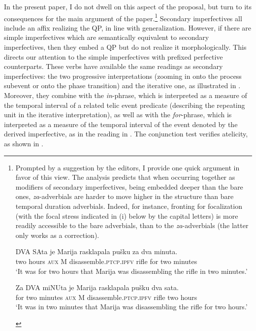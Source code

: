 \documentclass[output=paper]{langscibook}
\begin{document}
In the present paper, I do not dwell on this aspect of the proposal, but turn to its consequences for the main argument of the paper.{\footnote{Prompted by a suggestion by the editors, I provide one quick argument in favor of this view. The analysis predicts that when occurring together as modifiers of secondary imperfectives, being embedded deeper than the bare ones, \textit{za}-adverbials are harder to move higher in the structure than bare temporal duration adverbials. Indeed, for instance, fronting for focalization (with the focal stress indicated in (i) below by the capital letters) is more readily accessible to the bare adverbials, than to the \textit{za}-adverbials (the latter only works as a correction).
\ea\label{ars:ex:adv-foc}
	\begin{xlist} 
		
	    \ex  \gll DVA SAta je Marija rasklapala pušku za dva minuta.\\ 
                  two hours \textsc{aux} M disassemble\textsc{.ptcp.ipfv} rifle for two minutes\\ 
            \glt `It was for two hours that Marija was disassembling the rifle in two minutes.' \label{ars:ex:adv-foca}
            
           \ex \gll Za DVA miNUta je Marija rasklapala pušku dva sata.\\ 
                  for two minutes \textsc{aux} M disassemble\textsc{.ptcp.ipfv} rifle two hours\\ 
            \glt `It was in two minutes that Marija was disassembling the rifle for two hours.' \label{ars:ex:adv-focb}
            
	\end{xlist}
\z
}} Secondary imperfectives all include an affix realizing the QP, in line with  generalization. However, if there are simple imperfectives which are semantically equivalent to secondary imperfectives, then they embed a QP but do not realize it morphologically. This directs our attention to the simple imperfectives with prefixed perfective counterparts. These verbs have available the same readings as secondary imperfectives: the two progressive interpretations (zooming in onto the process subevent or onto the phase transition) and the iterative one, as illustrated in . Moreover, they combine with the \textit{in}-phrase, which is interpreted as a measure of the temporal interval of a related telic event predicate (describing the repeating unit in the iterative interpretation), as well as with the \textit{for}-phrase, which is interpreted as a measure of the temporal interval of the event denoted by the derived imperfective, as in the reading in . The conjunction test verifies atelicity, as shown in .
\end{document}
